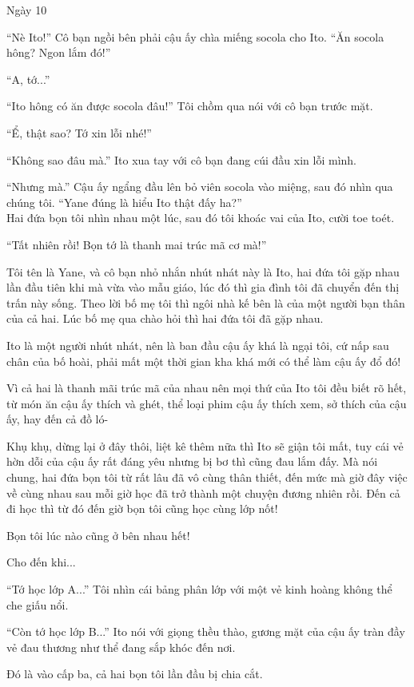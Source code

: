 {Ngày 10}
{

``Nè Ito!'' Cô bạn ngồi bên phải cậu ấy chìa miếng socola cho Ito. ``Ăn
socola hông? Ngon lắm đó!''

``A, tớ...''

``Ito hông có ăn được socola đâu!'' Tôi chồm qua nói với cô bạn trước
mặt.

``Ể, thật sao? Tớ xin lỗi nhé!''

``Không sao đâu mà.'' Ito xua tay với cô bạn đang cúi đầu xin lỗi mình.

``Nhưng mà.'' Cậu ấy ngẩng đầu lên bỏ viên socola vào miệng, sau đó nhìn
qua chúng tôi. ``Yane đúng là hiểu Ito thật đấy ha?''\\
Hai đứa bọn tôi nhìn nhau một lúc, sau đó tôi khoác vai của Ito, cười
toe toét.

``Tất nhiên rồi! Bọn tớ là thanh mai trúc mã cơ mà!''

Tôi tên là Yane, và cô bạn nhỏ nhắn nhút nhát này là Ito, hai đứa tôi
gặp nhau lần đầu tiên khi mà vừa vào mẫu giáo, lúc đó thì gia đình tôi
đã chuyển đến thị trấn này sống. Theo lời bố mẹ tôi thì ngôi nhà kế bên
là của một người bạn thân của cả hai. Lúc bố mẹ qua chào hỏi thì hai đứa
tôi đã gặp nhau.

Ito là một người nhút nhát, nên là ban đầu cậu ấy khá là ngại tôi, cứ
nấp sau chân của bố hoài, phải mất một thời gian kha khá mới có thể làm
cậu ấy đổ đó!

Vì cả hai là thanh mãi trúc mã của nhau nên mọi thứ của Ito tôi đều biết
rõ hết, từ món ăn cậu ấy thích và ghét, thể loại phim cậu ấy thích xem,
sở thích của cậu ấy, hay đến cả đồ ló-

Khụ khụ, dừng lại ở đây thôi, liệt kê thêm nữa thì Ito sẽ giận tôi mất,
tuy cái vẻ hờn dỗi của cậu ấy rất đáng yêu nhưng bị bơ thì cũng đau lắm
đấy. Mà nói chung, hai đứa bọn tôi từ rất lâu đã vô cùng thân thiết, đến
mức mà giờ đây việc về cùng nhau sau mỗi giờ học đã trở thành một chuyện
đương nhiên rồi. Đến cả đi học thì từ đó đến giờ bọn tôi cũng học cùng
lớp nốt!

Bọn tôi lúc nào cũng ở bên nhau hết!

Cho đến khi...

``Tớ học lớp A...'' Tôi nhìn cái bảng phân lớp với một vẻ kinh hoàng
không thể che giấu nổi.

``Còn tớ học lớp B...'' Ito nói với giọng thều thào, gương mặt của cậu
ấy tràn đầy vẻ đau thương như thể đang sắp khóc đến nơi.

Đó là vào cấp ba, cả hai bọn tôi lần đầu bị chia cắt.

}
